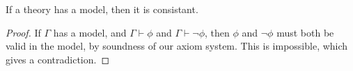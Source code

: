 
\begin{lemma}
    If a theory has a model, then it is consistant.
\end{lemma}
\begin{proof}
    If $\Gamma$ has a model, and $\Gamma \vdash \phi$ and $\Gamma \vdash \neg \phi$, then $\phi$ and $\neg \phi$ must both be valid in the model, by soundness of our axiom system. This is impossible, which gives a contradiction.
\end{proof}

